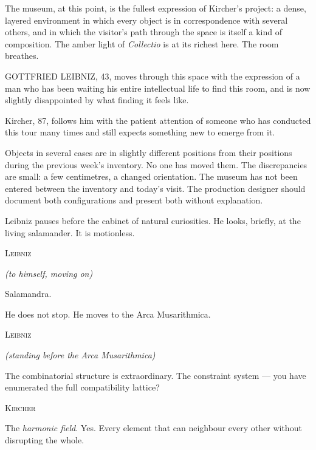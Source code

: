 \documentclass[12pt, a4paper, twoside]{memoir}
\theoremstyle{definition}
\theoremstyle{remark}
\newenvironment{action}{%
  \vspace{4pt}%
  \noindent\begin{minipage}{\linewidth}%
  \setlength{\parindent}{0pt}%
  \itshape\color{kircherink}%
}{%
  \end{minipage}\vspace{6pt}%
}
\newenvironment{dialogue}[1]{%
  \vspace{6pt}%
  \noindent\hspace{24mm}%
  \begin{minipage}{0.6\linewidth}%
  \begin{center}%
  {\small\textsc{#1}}%
  \end{center}%
  \vspace{2pt}%
}{%
  \end{minipage}\vspace{6pt}%
}
\newcommand{\paren}[1]{%
  \begin{center}%
  \small\itshape\color{plaguegrey}(#1)%
  \end{center}%
}
\newenvironment{museumnote}{%
  \vspace{4pt}%
  \noindent\begin{mdframed}[
    linecolor=arkgold!60,
    linewidth=0.4pt,
    leftline=true, rightline=false, topline=false, bottomline=false,
    innerleftmargin=8pt,
    innerrightmargin=0pt,
    innertopmargin=2pt,
    innerbottommargin=2pt,
    backgroundcolor=arkgold!4
  ]%
  \footnotesize\color{plaguegrey}%
}{%
  \end{mdframed}\vspace{4pt}%
}
\begin{document}
\begin{action}
The museum, at this point, is the fullest expression of Kircher's project: a dense, layered environment in which every object is in correspondence with several others, and in which the visitor's path through the space is itself a kind of composition. The amber light of \textit{Collectio} is at its richest here. The room breathes.

GOTTFRIED LEIBNIZ, 43, moves through this space with the expression of a man who has been waiting his entire intellectual life to find this room, and is now slightly disappointed by what finding it feels like.

Kircher, 87, follows him with the patient attention of someone who has conducted this tour many times and still expects something new to emerge from it.
\end{action}

\begin{museumnote}
Objects in several cases are in slightly different positions from their positions during the previous week's inventory. No one has moved them. The discrepancies are small: a few centimetres, a changed orientation. The museum has not been entered between the inventory and today's visit. The production designer should document both configurations and present both without explanation.
\end{museumnote}

\begin{action}
Leibniz pauses before the cabinet of natural curiosities. He looks, briefly, at the living salamander. It is motionless.
\end{action}

\begin{dialogue}{Leibniz}
\paren{to himself, moving on}
Salamandra.
\end{dialogue}

\begin{action}
He does not stop. He moves to the Arca Musarithmica.
\end{action}

\begin{dialogue}{Leibniz}
\paren{standing before the Arca Musarithmica}
The combinatorial structure is extraordinary. The constraint system --- you have enumerated the full compatibility lattice?
\end{dialogue}

\begin{dialogue}{Kircher}
The \textit{harmonic field}. Yes. Every element that can neighbour every other without disrupting the whole.
\end{dialogue}
\end{document}
